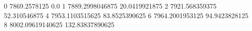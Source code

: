 0 7869.2578125 0.0
1 7889.2998046875 20.0419921875
2 7921.568359375 52.310546875
4 7953.1103515625 83.8525390625
6 7964.2001953125 94.9423828125
8 8002.09619140625 132.83837890625
